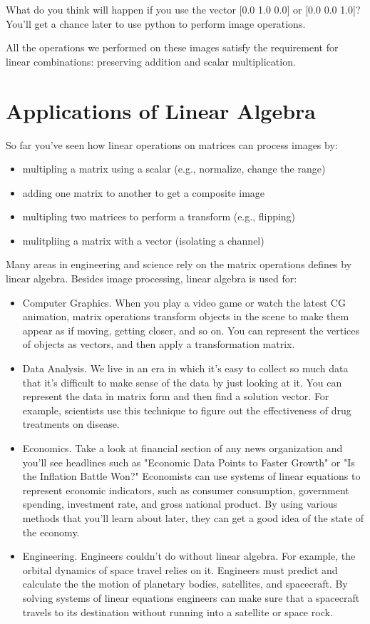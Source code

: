 What do you think will happen if you use the vector [0.0 1.0 0.0] or [0.0 0.0 1.0]? You'll get a chance later to use python to perform image operations.

All the operations we performed on these images satisfy the requirement for linear combinations: preserving addition and scalar multiplication. 


\section{Applications of Linear Algebra}

So far you've seen how linear operations on matrices can process images by:
\begin{itemize}
\item multipling a matrix using a scalar (e.g., normalize, change the range)
\item adding one matrix to another to get a composite image 
\item multipling two matrices to perform a transform (e.g., flipping)
\item mulitpliing a matrix with a vector (isolating a channel)
\end{itemize}

Many areas in engineering and science rely on the matrix operations defines by linear algebra. Besides image processing, linear algebra is used for: 
\begin{itemize}
\item Computer Graphics. When you play a video game or watch the latest CG animation, matrix operations transform objects in the scene to make them appear as if moving, getting closer, and so on. You can represent the vertices of objects as vectors, and then apply a transformation matrix.
\item Data Analysis. We live in an era in which it's easy to collect so much data that it's difficult to make sense of the data by just looking at it. You can represent the data in matrix form and then find a solution vector. For example, scientists use this technique to figure out the effectiveness of drug treatments on disease.
\item Economics. Take a look at financial section of any news organization and you'll see headlines such as "Economic Data Points to Faster Growth" or "Is the Inflation Battle Won?" Economists can use systems of linear equations to represent economic indicators, such as consumer consumption, government spending, investment rate, and gross national product. By using various methods that you'll learn about later, they can get a good idea of the state of the economy.
\item Engineering. Engineers couldn't do without linear algebra. For example, the orbital dynamics of space travel relies on it. Engineers must predict and calculate the the motion of planetary bodies, satellites, and spacecraft. By solving systems of linear equations engineers can make sure that a spacecraft travels to its destination without running into a satellite or space rock.
\end{itemize}

